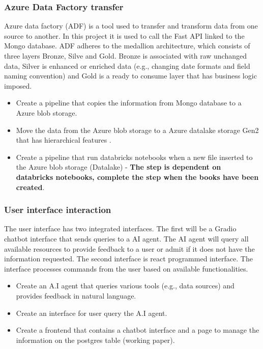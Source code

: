 \documentclass{article}
\begin{document}
\subsubsection{Azure Data Factory transfer}
Azure data factory (ADF) is a tool used to transfer and transform data from one source to another. In this project it  is used to call the Fast API 
linked to the Mongo database. ADF adheres to the medallion architecture, which consists of three layers Bronze, Silve and Gold. Bronze is associated
with raw unchanged data, Silver is enhanced or enriched data (e.g., changing date formats and field naming convention) and Gold is a ready to consume layer that
has business logic imposed.
\begin{itemize}
    \item Create a pipeline that copies the information from Mongo database to a Azure blob storage.
    \item Move the data from the Azure blob storage to a Azure datalake storage Gen2 that has hierarchical features .
    \item Create a pipeline that run databricks notebooks when a new file inserted to the Azure blob storage (Datalake) - \textbf{The step is dependent on databricks notebooks, complete the step when the books have been created}.
\end{itemize}
\subsubsection{User interface interaction}
The user interface has two integrated interfaces. The first will be a Gradio chatbot interface that sends queries to a AI agent. The AI agent
will query all available resources to provide feedback to a user or admit if it does not have the information requested. The second interface is react
programmed interface. The interface processes commands from the user based on available functionalities. 
\begin{itemize}
    \item Create an A.I agent that queries various tools (e.g., data sources) and provides feedback in natural language.
    \item Create an interface for user query the A.I agent.
    \item Create a frontend that contains a chatbot interface and a page to manage the information on the postgres table (working paper).
\end{itemize}
\end{document}

